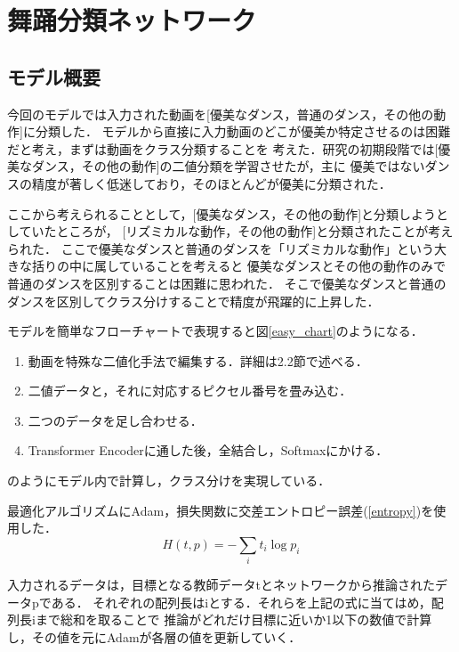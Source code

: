 \section{舞踊分類ネットワーク}

\subsection{モデル概要}
今回のモデルでは入力された動画を[優美なダンス，普通のダンス，その他の動作]に分類した．
モデルから直接に入力動画のどこが優美か特定させるのは困難だと考え，まずは動画をクラス分類することを
考えた．研究の初期段階では[優美なダンス，その他の動作]の二値分類を学習させたが，主に
優美ではないダンスの精度が著しく低迷しており，そのほとんどが優美に分類された．

ここから考えられることとして，[優美なダンス，その他の動作]と分類しようとしていたところが，
[リズミカルな動作，その他の動作]と分類されたことが考えられた．
ここで優美なダンスと普通のダンスを「リズミカルな動作」という大きな括りの中に属していることを考えると
優美なダンスとその他の動作のみで普通のダンスを区別することは困難に思われた．
そこで優美なダンスと普通のダンスを区別してクラス分けすることで精度が飛躍的に上昇した．

モデルを簡単なフローチャートで表現すると図\ref{easy_chart}のようになる．
\begin{enumerate}
  \item 動画を特殊な二値化手法で編集する．詳細は2.2節で述べる．
  \item 二値データと，それに対応するピクセル番号を畳み込む．
  \item 二つのデータを足し合わせる．
  \item Transformer Encoderに通した後，全結合し，Softmaxにかける．
\end{enumerate}
のようにモデル内で計算し，クラス分けを実現している．

最適化アルゴリズムにAdam\cite{adam}，損失関数に交差エントロピー誤差(\ref{entropy})を使用した．
\begin{equation}
  H(t, p) = -\sum_{i}t_i\log p_i
  \label{entropy}
\end{equation}

入力されるデータは，目標となる教師データtとネットワークから推論されたデータpである．
それぞれの配列長はiとする．それらを上記の式に当てはめ，配列長iまで総和を取ることで
推論がどれだけ目標に近いか1以下の数値で計算し，その値を元にAdamが各層の値を更新していく．
\clearpage

